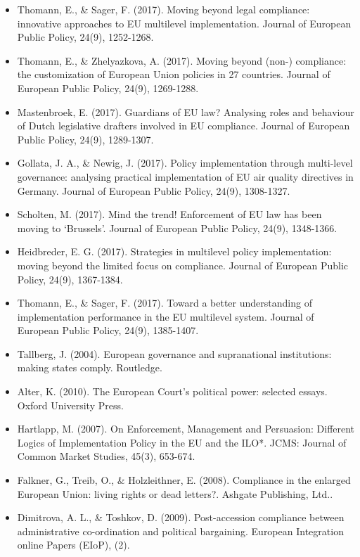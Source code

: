 \begin{itemize}
	\item Thomann, E., \& Sager, F. (2017). Moving beyond legal compliance: innovative approaches to EU multilevel implementation. Journal of European Public Policy, 24(9), 1252-1268.
	\item Thomann, E., \& Zhelyazkova, A. (2017). Moving beyond (non-) compliance: the customization of European Union policies in 27 countries. Journal of European Public Policy, 24(9), 1269-1288.
	\item Mastenbroek, E. (2017). Guardians of EU law? Analysing roles and behaviour of Dutch legislative drafters involved in EU compliance. Journal of European Public Policy, 24(9), 1289-1307.
	\item Gollata, J. A., \& Newig, J. (2017). Policy implementation through multi-level governance: analysing practical implementation of EU air quality directives in Germany. Journal of European Public Policy, 24(9), 1308-1327.
	\item Scholten, M. (2017). Mind the trend! Enforcement of EU law has been moving to ‘Brussels’. Journal of European Public Policy,  24(9), 1348-1366.
	\item Heidbreder, E. G. (2017). Strategies in multilevel policy implementation: moving beyond the limited focus on compliance. Journal of European Public Policy,  24(9), 1367-1384.
	\item Thomann, E., \& Sager, F. (2017). Toward a better understanding of implementation performance in the EU multilevel system. Journal of European Public Policy, 24(9), 1385-1407. 
	\item Tallberg, J. (2004). European governance and supranational institutions: making states comply. Routledge.
	\item Alter, K. (2010). The European Court's political power: selected essays. Oxford University Press.
	\item Hartlapp, M. (2007). On Enforcement, Management and Persuasion: Different Logics of Implementation Policy in the EU and the ILO*. JCMS: Journal of Common Market Studies, 45(3), 653-674.
	\item Falkner, G., Treib, O., \& Holzleithner, E. (2008). Compliance in the enlarged European Union: living rights or dead letters?. Ashgate Publishing, Ltd..
	\item Dimitrova, A. L., \& Toshkov, D. (2009). Post-accession compliance between administrative co-ordination and political bargaining. European Integration online Papers (EIoP), (2).

\end{itemize}

